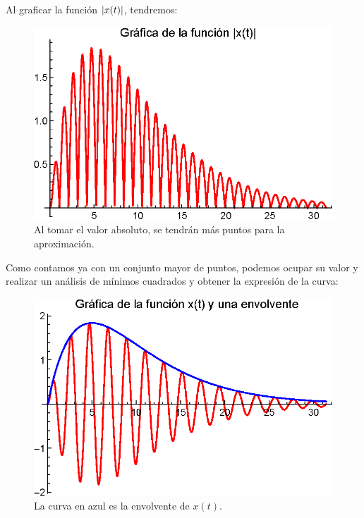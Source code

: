 Al graficar la función $\abs{x(t)}$, tendremos:
\begin{figure}[H]
    \centering
    \includegraphics[scale=1]{Imagenes/Ejemplo_Resonancia_02.eps}
    \caption{Al tomar el valor absoluto, se tendrán más puntos para la aproximación.}
\end{figure}

Como contamos ya con un conjunto mayor de puntos, podemos ocupar su valor y realizar un análisis de mínimos cuadrados y obtener la expresión de la curva:
\begin{figure}[H]
    \centering
    \includegraphics[scale=1]{Imagenes/Ejemplo_Resonancia_03.eps}
    \caption{La curva en azul es la envolvente de $x(t)$.}
\end{figure}

